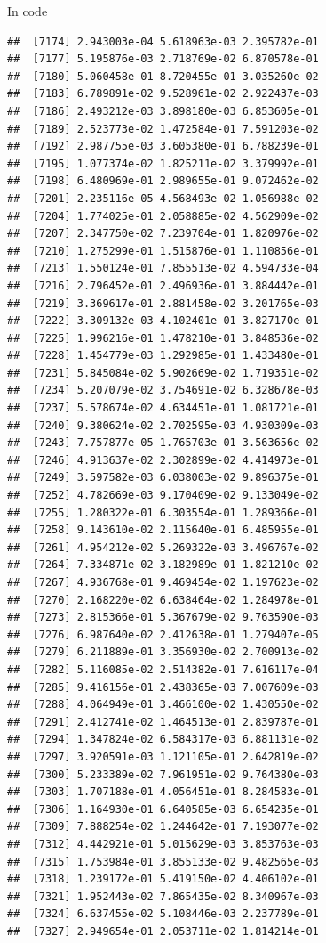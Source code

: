 \documentclass[ignorenonframetext,]{beamer}
\begin{document}
\begin{frame}[fragile]{In code}
\begin{verbatim}
##  [7174] 2.943003e-04 5.618963e-03 2.395782e-01
##  [7177] 5.195876e-03 2.718769e-02 6.870578e-01
##  [7180] 5.060458e-01 8.720455e-01 3.035260e-02
##  [7183] 6.789891e-02 9.528961e-02 2.922437e-03
##  [7186] 2.493212e-03 3.898180e-03 6.853605e-01
##  [7189] 2.523773e-02 1.472584e-01 7.591203e-02
##  [7192] 2.987755e-03 3.605380e-01 6.788239e-01
##  [7195] 1.077374e-02 1.825211e-02 3.379992e-01
##  [7198] 6.480969e-01 2.989655e-01 9.072462e-02
##  [7201] 2.235116e-05 4.568493e-02 1.056988e-02
##  [7204] 1.774025e-01 2.058885e-02 4.562909e-02
##  [7207] 2.347750e-02 7.239704e-01 1.820976e-02
##  [7210] 1.275299e-01 1.515876e-01 1.110856e-01
##  [7213] 1.550124e-01 7.855513e-02 4.594733e-04
##  [7216] 2.796452e-01 2.496936e-01 3.884442e-01
##  [7219] 3.369617e-01 2.881458e-02 3.201765e-03
##  [7222] 3.309132e-03 4.102401e-01 3.827170e-01
##  [7225] 1.996216e-01 1.478210e-01 3.848536e-02
##  [7228] 1.454779e-03 1.292985e-01 1.433480e-01
##  [7231] 5.845084e-02 5.902669e-02 1.719351e-02
##  [7234] 5.207079e-02 3.754691e-02 6.328678e-03
##  [7237] 5.578674e-02 4.634451e-01 1.081721e-01
##  [7240] 9.380624e-02 2.702595e-03 4.930309e-03
##  [7243] 7.757877e-05 1.765703e-01 3.563656e-02
##  [7246] 4.913637e-02 2.302899e-02 4.414973e-01
##  [7249] 3.597582e-03 6.038003e-02 9.896375e-01
##  [7252] 4.782669e-03 9.170409e-02 9.133049e-02
##  [7255] 1.280322e-01 6.303554e-01 1.289366e-01
##  [7258] 9.143610e-02 2.115640e-01 6.485955e-01
##  [7261] 4.954212e-02 5.269322e-03 3.496767e-02
##  [7264] 7.334871e-02 3.182989e-01 1.821210e-02
##  [7267] 4.936768e-01 9.469454e-02 1.197623e-02
##  [7270] 2.168220e-02 6.638464e-02 1.284978e-01
##  [7273] 2.815366e-01 5.367679e-02 9.763590e-03
##  [7276] 6.987640e-02 2.412638e-01 1.279407e-05
##  [7279] 6.211889e-01 3.356930e-02 2.700913e-02
##  [7282] 5.116085e-02 2.514382e-01 7.616117e-04
##  [7285] 9.416156e-01 2.438365e-03 7.007609e-03
##  [7288] 4.064949e-01 3.466100e-02 1.430550e-02
##  [7291] 2.412741e-02 1.464513e-01 2.839787e-01
##  [7294] 1.347824e-02 6.584317e-03 6.881131e-02
##  [7297] 3.920591e-03 1.121105e-01 2.642819e-02
##  [7300] 5.233389e-02 7.961951e-02 9.764380e-03
##  [7303] 1.707188e-01 4.056451e-01 8.284583e-01
##  [7306] 1.164930e-01 6.640585e-03 6.654235e-01
##  [7309] 7.888254e-02 1.244642e-01 7.193077e-02
##  [7312] 4.442921e-01 5.015629e-03 3.853763e-03
##  [7315] 1.753984e-01 3.855133e-02 9.482565e-03
##  [7318] 1.239172e-01 5.419150e-02 4.406102e-01
##  [7321] 1.952443e-02 7.865435e-02 8.340967e-03
##  [7324] 6.637455e-02 5.108446e-03 2.237789e-01
##  [7327] 2.949654e-01 2.053711e-02 1.814214e-01

\end{verbatim}
\end{frame}
\end{document}
